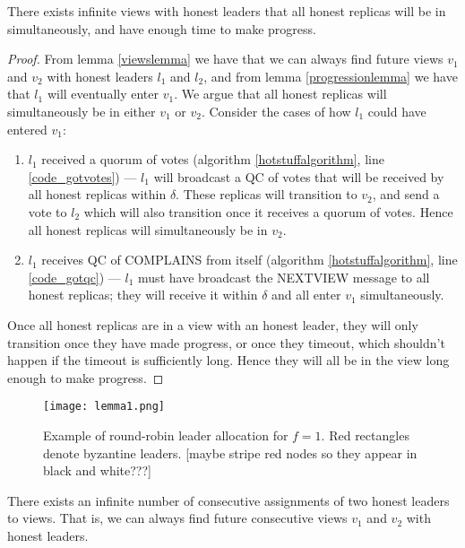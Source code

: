 \begin{theorem} \label{viewsync}
	There exists infinite views with honest leaders that all honest replicas will be in simultaneously, and have enough time to make progress.
\end{theorem}

\begin{proof}
	From lemma \ref{viewslemma} we have that we can always find future views $v_1$ and $v_2$ with honest leaders $l_1$ and $l_2$, and from lemma \ref{progressionlemma} we have that $l_1$ will eventually enter $v_1$. We argue that all honest replicas will simultaneously be in either $v_1$ or $v_2$. Consider the cases of how $l_1$ could have entered $v_1$:
	\begin{enumerate}
		\item $l_1$ received a quorum of votes (algorithm \ref{hotstuffalgorithm}, line \ref{code_gotvotes}) --- $l_1$ will broadcast a QC of votes that will be received by all honest replicas within $\delta$. These replicas will transition to $v_2$, and send a vote to $l_2$ which will also transition once it receives a quorum of votes. Hence all honest replicas will simultaneously be in $v_2$.
		\item $l_1$ receives QC of COMPLAINS from itself (algorithm \ref{hotstuffalgorithm}, line \ref{code_gotqc}) --- $l_1$ must have broadcast the NEXT{\large V}IEW message to all honest replicas; they will receive it within $\delta$ and all enter $v_1$ simultaneously.
	\end{enumerate}
	Once all honest replicas are in a view with an honest leader, they will only transition once they have made progress, or once they timeout, which shouldn't happen if the timeout is sufficiently long. Hence they will all be in the view long enough to make progress.
\end{proof}

\begin{figure}[h!]
	\centering
	\texttt{[image: lemma1.png]}
	\caption{Example of round-robin leader allocation for $f = 1$. Red rectangles denote byzantine leaders. [maybe stripe red nodes so they appear in black and white???]}
	\label{lemma1diagram}
\end{figure}

\begin{lemma} \label{viewslemma}
	There exists an infinite number of consecutive assignments of two honest leaders to views. That is, we can always find future consecutive views $v_1$ and $v_2$ with honest leaders.
\end{lemma}


